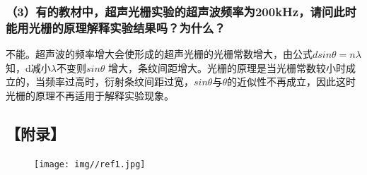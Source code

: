 \documentclass[12pt,a4paper,UTF8]{ctexart}
\begin{document}
\subsubsection*{（3）有的教材中，超声光栅实验的超声波频率为200kHz，请问此时能用光栅的原理解释实验结果吗？为什么？}
不能。超声波的频率增大会使形成的超声光栅的光栅常数增大，由公式$dsin\theta=n\lambda$知，d减小$\lambda$不变则$sin\theta$ 增大，条纹间距增大。光栅的原理是当光栅常数较小时成立的，当频率过高时，衍射条纹间距过宽，$sin\theta$与$\theta$的近似性不再成立，因此这时光栅的原理不再适用于解释实验现象。

\newpage
\subsection*{【附录】}
\begin{figure}[htbp]
	\centering
	\texttt{[image: img//ref1.jpg]}
	\label{fig:3}
\end{figure}
\end{document}
